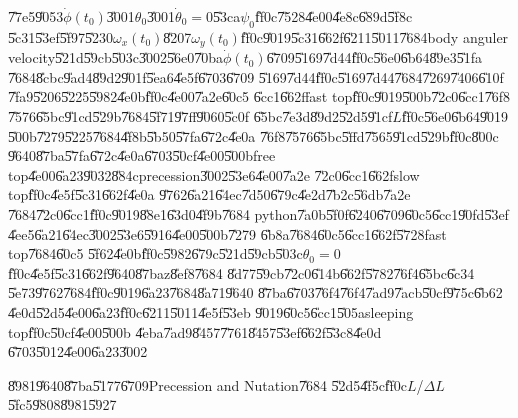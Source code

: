 \U{77e5}\U{9053}$\dot{\phi}(t_{0})$\U{3001}$\theta _{0}$\U{3001}$\dot{\theta}%
_{0}=0$\U{53ca}$\psi _{0}$\U{ff0c}\U{7528}\U{4e00}\U{4e8c}\U{689d}\U{5f8c}%
\U{5c31}\U{53ef}\U{5f97}\U{5230}$\omega _{x}(t_{0})$\U{8207}$\omega
_{y}(t_{0})$\U{ff0c}\U{9019}\U{5c31}\U{662f}\U{6211}\U{5011}\U{7684}body
anguler velocity\U{521d}\U{59cb}\U{503c}\U{3002}\U{56e0}\U{70ba}$\dot{\phi}%
(t_{0})$\U{6709}\U{5169}\U{7d44}\U{ff0c}\U{56e0}\U{6b64}\U{89e3}\U{51fa}%
\U{7684}\U{8cbc}\U{9ad4}\U{89d2}\U{901f}\U{5ea6}\U{4e5f}\U{6703}\U{6709}%
\U{5169}\U{7d44}\U{ff0c}\U{5169}\U{7d44}\U{7684}\U{7269}\U{7406}\U{610f}%
\U{7fa9}\U{5206}\U{5225}\U{5982}\U{4e0b}\U{ff0c}\U{4e00}\U{7a2e}\U{60c5}%
\U{6cc1}\U{662f}fast top\U{ff0c}\U{9019}\U{500b}\U{72c0}\U{6cc1}\U{76f8}%
\U{7576}\U{65bc}\U{91cd}\U{529b}\U{7684}\U{5f71}\U{97ff}\U{9060}\U{5c0f}%
\U{65bc}\U{7e3d}\U{89d2}\U{52d5}\U{91cf}$L$\U{ff0c}\U{56e0}\U{6b64}\U{9019}%
\U{500b}\U{7279}\U{5225}\U{7684}\U{4f8b}\U{5b50}\U{57fa}\U{672c}\U{4e0a}%
\U{76f8}\U{7576}\U{65bc}\U{5ffd}\U{7565}\U{91cd}\U{529b}\U{ff0c}\U{800c}%
\U{9640}\U{87ba}\U{57fa}\U{672c}\U{4e0a}\U{6703}\U{50cf}\U{4e00}\U{500b}free
top\U{4e00}\U{6a23}\U{9032}\U{884c}precession\U{3002}\U{53e6}\U{4e00}\U{7a2e}%
\U{72c0}\U{6cc1}\U{662f}slow top\U{ff0c}\U{4e5f}\U{5c31}\U{662f}\U{4e0a}%
\U{9762}\U{6a21}\U{64ec}\U{7d50}\U{679c}\U{4e2d}\U{7b2c}\U{56db}\U{7a2e}%
\U{7684}\U{72c0}\U{6cc1}\U{ff0c}\U{9019}\U{88e1}\U{63d0}\U{4f9b}\U{7684}%
python\U{7a0b}\U{5f0f}\U{6240}\U{6709}\U{60c5}\U{6cc1}\U{90fd}\U{53ef}%
\U{4ee5}\U{6a21}\U{64ec}\U{3002}\U{53e6}\U{5916}\U{4e00}\U{500b}\U{7279}%
\U{6b8a}\U{7684}\U{60c5}\U{6cc1}\U{662f}\U{5728}fast top\U{7684}\U{60c5}%
\U{5f62}\U{4e0b}\U{ff0c}\U{5982}\U{679c}\U{521d}\U{59cb}\U{503c}$\theta
_{0}=0$\U{ff0c}\U{4e5f}\U{5c31}\U{662f}\U{9640}\U{87ba}z\U{8ef8}\U{7684}%
\U{8d77}\U{59cb}\U{72c0}\U{614b}\U{662f}\U{5782}\U{76f4}\U{65bc}\U{6c34}%
\U{5e73}\U{9762}\U{7684}\U{ff0c}\U{9019}\U{6a23}\U{7684}\U{8a71}\U{9640}%
\U{87ba}\U{6703}\U{76f4}\U{76f4}\U{7ad9}\U{7acb}\U{50cf}\U{975c}\U{6b62}%
\U{4e0d}\U{52d5}\U{4e00}\U{6a23}\U{ff0c}\U{6211}\U{5011}\U{4e5f}\U{53eb}%
\U{9019}\U{60c5}\U{6cc1}\U{505a}sleeping top\U{ff0c}\U{50cf}\U{4e00}\U{500b}%
\U{4eba}\U{7ad9}\U{8457}\U{7761}\U{8457}\U{53ef}\U{662f}\U{53c8}\U{4e0d}%
\U{6703}\U{5012}\U{4e00}\U{6a23}\U{3002}

\begin{case}
\U{8981}\U{9640}\U{87ba}\U{5177}\U{6709}Precession and Nutation\U{7684}%
\U{52d5}\U{4f5c}\U{ff0c}$L$/$\Delta L$\U{5fc5}\U{9808}\U{8981}\U{5927}
\end{case}

